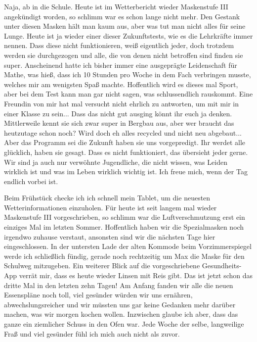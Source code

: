 \documentclass[twoside, a4paper, DIV=11, open=any, bibliography=totoc]{scrbook}
\newcommand{\Quote}[1]{\glqq #1\grqq{}}
\begin{document}
Naja, ab in die Schule. 
Heute ist im Wetterbericht wieder Maskenstufe III angekündigt worden,
so schlimm war es schon lange nicht mehr. Den Gestank unter diesen Masken hält man kaum
aus, aber was tut man nicht alles für seine Lunge.
Heute ist ja wieder einer dieser \Quote{Zukunftstests}, wie es
die Lehrkräfte immer nennen.
Dass diese nicht funktionieren, weiß eigentlich jeder, doch trotzdem werden sie
durchgezogen und alle, die
von denen nicht betroffen sind finden sie super. Anscheinend hatte ich bisher immer
eine ausgeprägte Leidenschaft für Mathe, was hieß, dass ich 10 Stunden pro Woche in
dem Fach verbringen musste,
welches mir am wenigsten Spaß machte. Hoffentlich wird es dieses mal Sport, aber
bei dem Test kann man gar nicht
sagen, was schlussendlich rauskommt. Eine Freundin von mir hat mal versucht nicht
ehrlich zu antworten, um
mit mir in einer Klasse zu sein... Dass das nicht gut ausging könnt ihr euch ja
denken. Mittlerweile kennt
sie sich zwar super in Bergbau aus, aber wer braucht das heutzutage schon noch?
Wird doch eh alles recycled und
nicht neu abgebaut... Aber das Programm sei die Zukunft haben sie uns vorgepredigt.
Ihr werdet alle glücklich,
haben sie gesagt. Dass es nicht funktioniert, das übersieht jeder gerne. Wir sind
ja auch nur verwöhnte
Jugendliche, die nicht wissen, was Leiden wirklich ist und was im Leben wirklich wichtig
ist.
Ich freue mich, wenn der Tag endlich vorbei ist.

\vspace{10pt}

Beim Frühstück checke ich ich schnell mein Tablet, um die neuesten Wetterinformationen
einzuholen. Für heute ist seit langem mal wieder Maskenstufe III vorgeschrieben, 
so schlimm war die Luftverschmutzung erst ein einziges Mal im letzten Sommer.
Hoffentlich haben wir die Spezialmasken noch irgendwo zuhause verstaut,
ansonsten sind wir die nächsten Tage hier eingeschlossen. In der untersten Lade
der alten Kommode beim Vorzimmerspiegel werde ich schließlich fündig, gerade noch
rechtzeitig um Max die Maske für den Schulweg mitzugeben.
Ein weiterer Blick auf die vorgeschriebene Gesundheits-App verrät mir, dass
es heute wieder Linsen mit Reis gibt. Das ist jetzt schon das dritte Mal in den
letzten zehn Tagen! Am Anfang fanden wir alle die neuen Essenspläne noch toll,
viel gesünder würden wir uns ernähren, abwechslungsreicher und wir müssten uns
gar keine Gedanken mehr darüber machen, was wir morgen kochen wollen.
Inzwischen glaube ich aber, dass das ganze ein ziemlicher Schuss in den Ofen war.
Jede Woche der selbe, langweilige Fraß und viel gesünder 
fühl ich mich auch nicht als zuvor.
\end{document}
